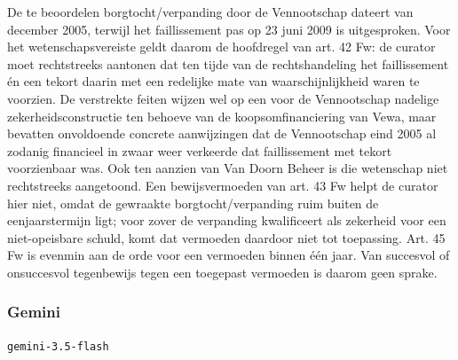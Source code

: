 \documentclass[
  dutch,
  a4paper,
]{article}
\begin{document}
De te beoordelen borgtocht/verpanding door de Vennootschap dateert van december 2005, terwijl het faillissement pas op 23 juni 2009 is uitgesproken. Voor het wetenschapsvereiste geldt daarom de hoofdregel van art. 42 Fw: de curator moet rechtstreeks aantonen dat ten tijde van de rechtshandeling het faillissement én een tekort daarin met een redelijke mate van waarschijnlijkheid waren te voorzien. De verstrekte feiten wijzen wel op een voor de Vennootschap nadelige zekerheidsconstructie ten behoeve van de koopsomfinanciering van Vewa, maar bevatten onvoldoende concrete aanwijzingen dat de Vennootschap eind 2005 al zodanig financieel in zwaar weer verkeerde dat faillissement met tekort voorzienbaar was. Ook ten aanzien van Van Doorn Beheer is die wetenschap niet rechtstreeks aangetoond. Een bewijsvermoeden van art. 43 Fw helpt de curator hier niet, omdat de gewraakte borgtocht/verpanding ruim buiten de eenjaarstermijn ligt; voor zover de verpanding kwalificeert als zekerheid voor een niet-opeisbare schuld, komt dat vermoeden daardoor niet tot toepassing. Art. 45 Fw is evenmin aan de orde voor een vermoeden binnen één jaar. Van succesvol of onsuccesvol tegenbewijs tegen een toegepast vermoeden is daarom geen sprake.

\newpage


\subsubsection{Gemini}\label{gemini-1}

\texttt{gemini-3.5-flash}
\end{document}
